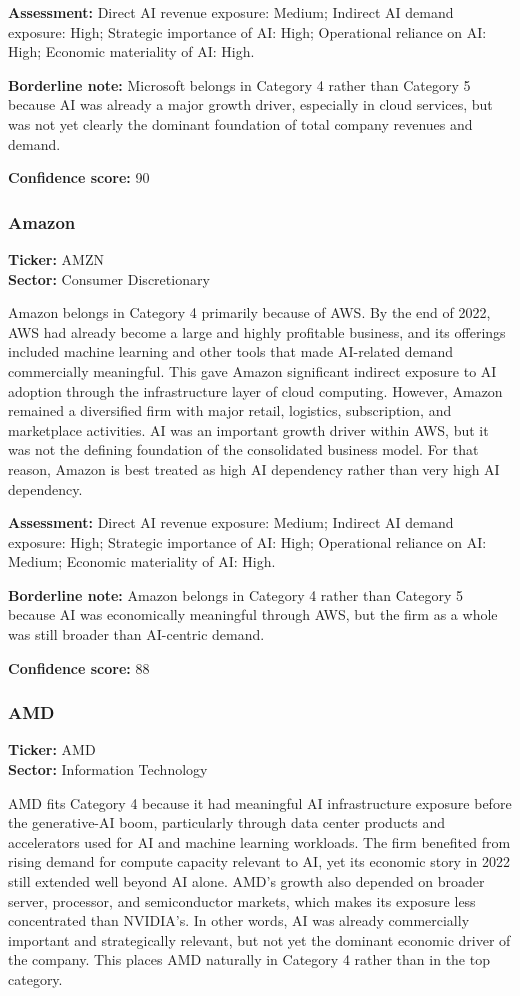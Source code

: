 \documentclass{article}
\begin{document}
\textbf{Assessment:} Direct AI revenue exposure: Medium; Indirect AI demand exposure: High; Strategic importance of AI: High; Operational reliance on AI: High; Economic materiality of AI: High.

\textbf{Borderline note:} Microsoft belongs in Category 4 rather than Category 5 because AI was already a major growth driver, especially in cloud services, but was not yet clearly the dominant foundation of total company revenues and demand.

\textbf{Confidence score:} 90

\subsubsection*{Amazon}
\textbf{Ticker:} AMZN \\
\textbf{Sector:} Consumer Discretionary

Amazon belongs in Category 4 primarily because of AWS. By the end of 2022, AWS had already become a large and highly profitable business, and its offerings included machine learning and other tools that made AI-related demand commercially meaningful. This gave Amazon significant indirect exposure to AI adoption through the infrastructure layer of cloud computing. However, Amazon remained a diversified firm with major retail, logistics, subscription, and marketplace activities. AI was an important growth driver within AWS, but it was not the defining foundation of the consolidated business model. For that reason, Amazon is best treated as high AI dependency rather than very high AI dependency.

\textbf{Assessment:} Direct AI revenue exposure: Medium; Indirect AI demand exposure: High; Strategic importance of AI: High; Operational reliance on AI: Medium; Economic materiality of AI: High.

\textbf{Borderline note:} Amazon belongs in Category 4 rather than Category 5 because AI was economically meaningful through AWS, but the firm as a whole was still broader than AI-centric demand.

\textbf{Confidence score:} 88

\subsubsection*{AMD}
\textbf{Ticker:} AMD \\
\textbf{Sector:} Information Technology

AMD fits Category 4 because it had meaningful AI infrastructure exposure before the generative-AI boom, particularly through data center products and accelerators used for AI and machine learning workloads. The firm benefited from rising demand for compute capacity relevant to AI, yet its economic story in 2022 still extended well beyond AI alone. AMD’s growth also depended on broader server, processor, and semiconductor markets, which makes its exposure less concentrated than NVIDIA’s. In other words, AI was already commercially important and strategically relevant, but not yet the dominant economic driver of the company. This places AMD naturally in Category 4 rather than in the top category.
\end{document}
